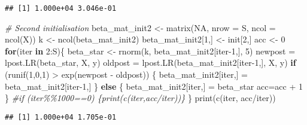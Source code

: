 \documentclass[
]{article}
\newenvironment{Shaded}{\begin{snugshade}}{\end{snugshade}}
\newcommand{\AttributeTok}[1]{\textcolor[rgb]{0.77,0.63,0.00}{#1}}
\newcommand{\CommentTok}[1]{\textcolor[rgb]{0.56,0.35,0.01}{\textit{#1}}}
\newcommand{\ConstantTok}[1]{\textcolor[rgb]{0.00,0.00,0.00}{#1}}
\newcommand{\ControlFlowTok}[1]{\textcolor[rgb]{0.13,0.29,0.53}{\textbf{#1}}}
\newcommand{\DecValTok}[1]{\textcolor[rgb]{0.00,0.00,0.81}{#1}}
\newcommand{\FunctionTok}[1]{\textcolor[rgb]{0.00,0.00,0.00}{#1}}
\newcommand{\NormalTok}[1]{#1}
\newcommand{\OtherTok}[1]{\textcolor[rgb]{0.56,0.35,0.01}{#1}}
\newcommand{\SpecialCharTok}[1]{\textcolor[rgb]{0.00,0.00,0.00}{#1}}
\begin{document}
\begin{verbatim}
## [1] 1.000e+04 3.046e-01
\end{verbatim}

\begin{Shaded}
\begin{Highlighting}[]
\CommentTok{\# Second initialisation}
\NormalTok{beta\_mat\_init2 }\OtherTok{\textless{}{-}} \FunctionTok{matrix}\NormalTok{(}\ConstantTok{NA}\NormalTok{, }\AttributeTok{nrow =}\NormalTok{ S, }\AttributeTok{ncol =} \FunctionTok{ncol}\NormalTok{(X))}
\NormalTok{k }\OtherTok{\textless{}{-}} \FunctionTok{ncol}\NormalTok{(beta\_mat\_init2)}
\NormalTok{beta\_mat\_init2[}\DecValTok{1}\NormalTok{,] }\OtherTok{\textless{}{-}}\NormalTok{ init[}\DecValTok{2}\NormalTok{,]}
\NormalTok{acc }\OtherTok{\textless{}{-}} \DecValTok{0}
\ControlFlowTok{for}\NormalTok{(iter }\ControlFlowTok{in} \DecValTok{2}\SpecialCharTok{:}\NormalTok{S)\{}
\NormalTok{  beta\_star }\OtherTok{\textless{}{-}} \FunctionTok{rnorm}\NormalTok{(k, beta\_mat\_init2[iter}\DecValTok{{-}1}\NormalTok{,], }\DecValTok{5}\NormalTok{)}
\NormalTok{  newpost }\OtherTok{=} \FunctionTok{lpost.LR}\NormalTok{(beta\_star, X, y)}
\NormalTok{  oldpost }\OtherTok{=} \FunctionTok{lpost.LR}\NormalTok{(beta\_mat\_init2[iter}\DecValTok{{-}1}\NormalTok{,], X, y)}
  \ControlFlowTok{if}\NormalTok{ (}\FunctionTok{runif}\NormalTok{(}\DecValTok{1}\NormalTok{,}\DecValTok{0}\NormalTok{,}\DecValTok{1}\NormalTok{) }\SpecialCharTok{\textgreater{}} \FunctionTok{exp}\NormalTok{(newpost }\SpecialCharTok{{-}}\NormalTok{ oldpost)) \{}
\NormalTok{    beta\_mat\_init2[iter,] }\OtherTok{=}\NormalTok{ beta\_mat\_init2[iter}\DecValTok{{-}1}\NormalTok{,]}
\NormalTok{  \} }\ControlFlowTok{else}\NormalTok{ \{}
\NormalTok{    beta\_mat\_init2[iter,] }\OtherTok{=}\NormalTok{ beta\_star}
\NormalTok{    acc}\OtherTok{=}\NormalTok{acc }\SpecialCharTok{+} \DecValTok{1}
\NormalTok{  \}}
  \CommentTok{\#if (iter\%\%1000==0) \{print(c(iter,acc/iter))\}}
\NormalTok{\}}
\FunctionTok{print}\NormalTok{(}\FunctionTok{c}\NormalTok{(iter, acc}\SpecialCharTok{/}\NormalTok{iter))}
\end{Highlighting}
\end{Shaded}

\begin{verbatim}
## [1] 1.000e+04 1.705e-01
\end{verbatim}
\end{document}
